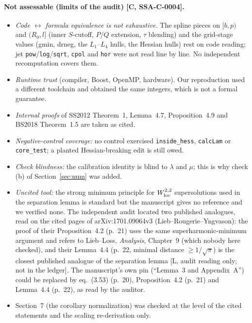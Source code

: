 \documentclass[10pt]{article}
\newcommand{\tier}[1]{\textsf{[#1]}}
\begin{document}
\paragraph{Not assessable (limits of the audit) \tier{C, SSA-C-0004}.}
\begin{itemize}
\item \emph{Code $\leftrightarrow$ formula equivalence is not exhaustive.} The spline pieces on $[b,p)$ and $(R_0,l]$ (inner $S$-cutoff, $P/Q$ extension, $\tau$ blending) and the grid-stage values (gmin, drneg, the $L_1$--$L_4$ hulls, the Hessian hulls) rest on code reading; jet \texttt{pow}/\texttt{log}/\texttt{sqrt}, \texttt{cpol} and \texttt{hor} were not read line by line. No independent recomputation covers them.
\item \emph{Runtime trust} (compiler, Boost, OpenMP, hardware). Our reproduction used a different toolchain and obtained the same integers, which is not a formal guarantee.
\item \emph{Internal proofs} of SS2012 Theorem~1, Lemma~4.7, Proposition~4.9 and BS2018 Theorem~1.5 are taken as cited.
\item \emph{Negative-control coverage:} no control exercised \texttt{inside\_hess}, \texttt{calcLam} or \texttt{core\_test}; a planted Hessian-breaking edit is still owed.
\item \emph{Check blindness:} the calibration identity is blind to $\lambda$ and $\mu$; this is why check (b) of Section~\ref{sec:num} was added.
\item \emph{Uncited tool:} the strong minimum principle for $W^{2,2}_{\rm loc}$ supersolutions used in the separation lemma is standard but the manuscript gives no reference and we verified none. The independent audit located two published analogues, read on the cited pages of arXiv:1701.09064v3 (Lieb--Rougerie--Yngvason): the proof of their Proposition~4.2 (p.~21) uses the same superharmonic-minimum argument and refers to Lieb--Loss, \emph{Analysis}, Chapter~9 (which nobody here checked), and their Lemma~4.4 (p.~22, minimal distance $\ge1/\sqrt\pi$) is the closest published analogue of the separation lemma \tier{L, audit reading only; not in the ledger}. The manuscript's own pin (``Lemma~3 and Appendix~A'') could be replaced by eq.~(3.53) (p.~20), Proposition~4.2 (p.~21) and Lemma~4.4 (p.~22), as read by the auditor.
\item Section~7 (the corollary normalization) was checked at the level of the cited statements and the scaling re-derivation only.
\end{itemize}
\end{document}

